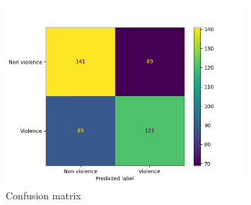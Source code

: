 \begin{figure}[H]
    \centering
    \includegraphics[width=0.8\textwidth]{images/731a-2D35-86ad-conf_matrix.png}
    \caption{Confusion matrix}
    \label{fig:Second2DCNNMatrix}
\end{figure}